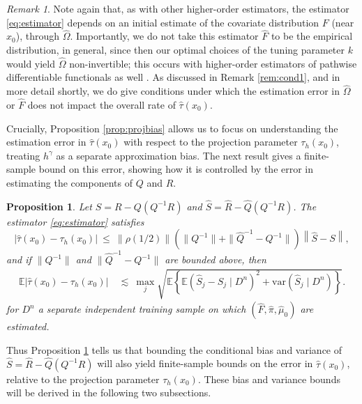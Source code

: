 \documentclass[11pt,twoside]{article}
\newcommand{\var}{\text{var}}
\newcommand{\E}{\mathbb{E}}
\newtheorem{proposition}{Proposition}
\theoremstyle{definition}
\theoremstyle{remark}
\newtheorem{remark}{Remark}
\begin{document}
\begin{remark}
Note again that, as with other higher-order  estimators, the estimator \eqref{eq:estimator} depends on an initial estimate of the covariate distribution $F$ (near $x_0$), through $\widehat\Omega$. Importantly, we do not take this estimator $\widehat{F}$ to be the empirical distribution, in general, since then our optimal choices of the tuning parameter $k$  would yield $\widehat\Omega$ non-invertible; this occurs with higher-order estimators of pathwise differentiable functionals as well \citep{mukherjee2017semiparametric}. As discussed  in Remark \ref{rem:cond1}, and in more detail shortly, we do give conditions under which the estimation error in $\widehat\Omega$ or $\widehat{F}$ does not impact the overall rate of $\widehat\tau(x_0)$.  \\
\end{remark}


Crucially, Proposition \ref{prop:projbias} allows us to focus on understanding the estimation error in $\widehat\tau(x_0)$ with respect to the projection parameter $\tau_h(x_0)$, treating $h^\gamma$ as a separate approximation bias. The next result gives a finite-sample bound on this error, showing how it is controlled by the error in estimating  the components of $Q$ and $R$.  \\


\begin{proposition} \label{prop:qrerror}
Let $S = R - Q (Q^{-1}R)$ and $\widehat{S} = \widehat{R} - \widehat{Q} (Q^{-1}R)$. The estimator \eqref{eq:estimator} satisfies
$$ \left| \widehat\tau(x_0) - \tau_h(x_0) \right| \ \leq \ \|\rho(1/2) \| \left( \| Q^{-1} \| +   \| \widehat{Q}^{-1} - {Q}^{-1} \| \right) \left\| \widehat{S} - S \right\|   , $$
and if 
 $\| Q^{-1} \|$ and $ \| \widehat{Q}^{-1} - {Q}^{-1} \|$  are bounded above, 
then
\begin{align*}
\E \left| \widehat\tau(x_0) - \tau_h(x_0) \right| \ &\lesssim \  \max_j  \sqrt{ \E\left\{ \E(\widehat{S}_j - S_j \mid D^n)^2 + \var(\widehat{S}_j \mid D^n) \right\} } .
\end{align*}
for $D^n$  a separate independent training sample on which $( \widehat{F}, \widehat\pi,\widehat\mu_0)$ are estimated. 
\end{proposition}

\bigskip

Thus Proposition \ref{prop:qrerror} tells us that bounding the conditional bias and variance of $\widehat{S}=\widehat{R}-\widehat{Q} (Q^{-1}R)$ will also yield finite-sample bounds on the error in $\widehat\tau(x_0)$, relative to the projection parameter $\tau_h(x_0)$. These bias and variance bounds will be derived in the following two subsections. \\
\end{document}
